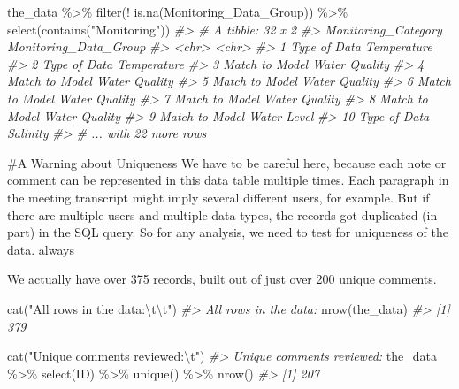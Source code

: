 \documentclass[
]{article}
\newenvironment{Shaded}{\begin{snugshade}}{\end{snugshade}}
\newcommand{\CommentTok}[1]{\textcolor[rgb]{0.56,0.35,0.01}{\textit{#1}}}
\newcommand{\FunctionTok}[1]{\textcolor[rgb]{0.00,0.00,0.00}{#1}}
\newcommand{\NormalTok}[1]{#1}
\newcommand{\SpecialCharTok}[1]{\textcolor[rgb]{0.00,0.00,0.00}{#1}}
\newcommand{\StringTok}[1]{\textcolor[rgb]{0.31,0.60,0.02}{#1}}
\begin{document}
\begin{Shaded}
\begin{Highlighting}[]
\NormalTok{the\_data }\SpecialCharTok{\%\textgreater{}\%}
  \FunctionTok{filter}\NormalTok{(}\SpecialCharTok{!} \FunctionTok{is.na}\NormalTok{(Monitoring\_Data\_Group)) }\SpecialCharTok{\%\textgreater{}\%}
  \FunctionTok{select}\NormalTok{(}\FunctionTok{contains}\NormalTok{(}\StringTok{"Monitoring"}\NormalTok{))}
\CommentTok{\#\textgreater{} \# A tibble: 32 x 2}
\CommentTok{\#\textgreater{}    Monitoring\_Category Monitoring\_Data\_Group}
\CommentTok{\#\textgreater{}    \textless{}chr\textgreater{}               \textless{}chr\textgreater{}                }
\CommentTok{\#\textgreater{}  1 Type of Data        Temperature          }
\CommentTok{\#\textgreater{}  2 Type of Data        Temperature          }
\CommentTok{\#\textgreater{}  3 Match to Model      Water Quality        }
\CommentTok{\#\textgreater{}  4 Match to Model      Water Quality        }
\CommentTok{\#\textgreater{}  5 Match to Model      Water Quality        }
\CommentTok{\#\textgreater{}  6 Match to Model      Water Quality        }
\CommentTok{\#\textgreater{}  7 Match to Model      Water Quality        }
\CommentTok{\#\textgreater{}  8 Match to Model      Water Quality        }
\CommentTok{\#\textgreater{}  9 Match to Model      Water Level          }
\CommentTok{\#\textgreater{} 10 Type of Data        Salinity             }
\CommentTok{\#\textgreater{} \# ... with 22 more rows}
\end{Highlighting}
\end{Shaded}

\#A Warning about Uniqueness We have to be careful here, because each
note or comment can be represented in this data table multiple times.
Each paragraph in the meeting transcript might imply several different
users, for example. But if there are multiple users and multiple data
types, the records got duplicated (in part) in the SQL query. So for any
analysis, we need to test for uniqueness of the data. always

We actually have over 375 records, built out of just over 200 unique
comments.

\begin{Shaded}
\begin{Highlighting}[]
\FunctionTok{cat}\NormalTok{(}\StringTok{"All rows in the data:}\SpecialCharTok{\textbackslash{}t\textbackslash{}t}\StringTok{"}\NormalTok{)}
\CommentTok{\#\textgreater{} All rows in the data:        }
\FunctionTok{nrow}\NormalTok{(the\_data)}
\CommentTok{\#\textgreater{} [1] 379}

\FunctionTok{cat}\NormalTok{(}\StringTok{"Unique comments reviewed:}\SpecialCharTok{\textbackslash{}t}\StringTok{"}\NormalTok{)}
\CommentTok{\#\textgreater{} Unique comments reviewed:    }
\NormalTok{the\_data }\SpecialCharTok{\%\textgreater{}\%}
  \FunctionTok{select}\NormalTok{(ID) }\SpecialCharTok{\%\textgreater{}\%}
  \FunctionTok{unique}\NormalTok{() }\SpecialCharTok{\%\textgreater{}\%}
  \FunctionTok{nrow}\NormalTok{()}
\CommentTok{\#\textgreater{} [1] 207}
\end{Highlighting}
\end{Shaded}
\end{document}
